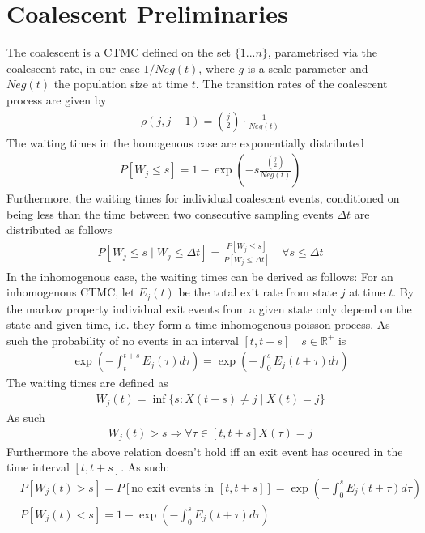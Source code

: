 \documentclass{report}
\newcommand{\R}{\mathbb{R}}
\theoremstyle{definition}
\begin{document}
\section{Coalescent Preliminaries}
The coalescent is a CTMC defined on the set $\{1 ... n\}$, parametrised via the coalescent rate, in our case $1/Neg(t)$, where $g$ is a scale parameter and $Neg(t)$ the population size at time $t$. 
The transition rates of the coalescent process are given by 
\begin{gather*}
\rho(j, j-1) = \binom{j}{2}\cdot\frac{1}{Neg(t)}
\end{gather*}
The waiting times in the homogenous case are exponentially distributed
\begin{gather*}
P[W_j \leq s] = 1-\exp(-s\frac{\binom{j}{2}}{Neg(t)})
\end{gather*}
Furthermore, the waiting times for individual coalescent events, conditioned on being less than the time between two consecutive sampling events $\Delta t$ are distributed as follows
\begin{gather}\label{eq:conditional}
P[W_j \leq s\mid W_j \leq \Delta t ] = \frac{P[W_j \leq s]}{P[W_j \leq \Delta t]} \quad\forall s \leq \Delta t
\end{gather}
In the inhomogenous case, the waiting times can be derived as follows:
For an inhomogenous CTMC, let $E_j(t)$ be the total exit rate from state $j$ at time $t$.
By the markov property individual exit events from a given state only depend on the state and given time, i.e. they form a time-inhomogenous poisson process.
As such the probability of no events in an interval $[t,t+s]\quad s\in \R^+$ is 
\begin{gather}
\exp(-\int_t^{t+s}E_j(\tau)d\tau) = \exp(-\int_0^{s}E_j(t+\tau)d\tau)
\end{gather}
The waiting times are defined as
\begin{gather}
W_j(t) = \inf\{s:X(t+s)\neq j \mid X(t) = j\}
\end{gather}
As such
\begin{gather}
W_j(t) > s \Rightarrow \forall \tau\in[t, t+s] X(\tau) = j
\end{gather}
Furthermore the above relation doesn't hold iff an exit event has occured in the time interval $[t,t+s]$. As such:
\begin{align*}
&P[W_j(t) > s] = P[\text{no exit events in }[t,t+s]] = \exp(-\int_0^{s}E_j(t+\tau)d\tau)\\
&P[W_j(t) < s] = 1 - \exp(-\int_0^{s}E_j(t+\tau)d\tau)
\end{align*}
\end{document}
